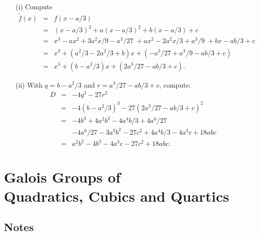 \begin{myenumerate}
\begin{itemize}
 \item[(i)]
 Compute
 \begin{eqnarray*}
 \tilde{f}(x) & = & f(x - a/3) \\
  & = & (x-a/3)^3 + a(x - a/3)^2 + b(x - a/3) + c \\
  & = & x^3 - ax^2 + 3a^2x/9 - a^3/27 \; + ax^2 - 2a^2x/3 + a^3/9 \;
        + bx - ab/3 + c \\
  & = & x^3 + (a^2/3 - 2a^2/3 + b)x  + (-a^3/27 + a^3/9 - ab/3 + c) \\
  & = & x^3 + (b - a^2/3)x  + (2a^3/27 - ab/3 + c).
 \end{eqnarray*}
 \item[(ii)]
  With \(q = b - a^2/3\) and \(r = a^3/27 - ab/3 + c\), compute:
 \begin{eqnarray*}
  D & = & -4q^3 - 27r^2 \\
    & = & -4(b - a^2/3)^3 - 27(2a^3/27 - ab/3 + c)^2 \\
    & = & -4b^3 + 4a^2b^2 - 4a^4b/3 + 4a^6/27 \\
    &   & - 4a^6/27 - 3a^2b^2 - 27c^2 + 4a^4b/3 - 4a^3c + 18abc \\
    & = & a^2b^2 -4b^3 - 4a^3c  - 27c^2 + 18abc.
 \end{eqnarray*}
\end{itemize}

\end{myenumerate}


\chapter[Groups -- Quadratics, Cubics and Quartics]{%
         Galois Groups of\\ Quadratics, Cubics and Quartics}


\section{Notes}

